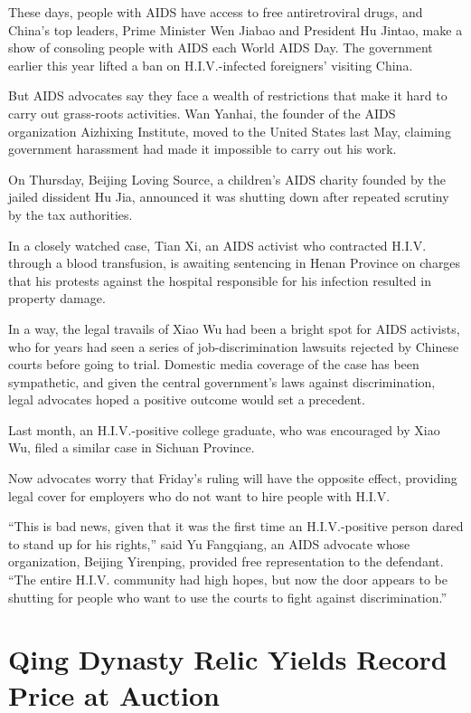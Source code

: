 ﻿\documentclass[12pt]{article}
\begin{document}
These days, people with AIDS have access to free antiretroviral drugs, and China's top leaders,
Prime Minister Wen Jiabao and President Hu Jintao, make a show of consoling people with AIDS each
World AIDS Day. The government earlier this year lifted a ban on H.I.V.-infected foreigners'
visiting China.

But AIDS advocates say they face a wealth of restrictions that make it hard to carry out grass-roots
activities. Wan Yanhai, the founder of the AIDS organization Aizhixing Institute, moved to the
United States last May, claiming government harassment had made it impossible to carry out his work.

On Thursday, Beijing Loving Source, a children's AIDS charity founded by the jailed dissident Hu
Jia, announced it was shutting down after repeated scrutiny by the tax authorities.

In a closely watched case, Tian Xi, an AIDS activist who contracted H.I.V. through a blood
transfusion, is awaiting sentencing in Henan Province on charges that his protests against the
hospital responsible for his infection resulted in property damage.

In a way, the legal travails of Xiao Wu had been a bright spot for AIDS activists, who for years had
seen a series of job-discrimination lawsuits rejected by Chinese courts before going to trial.
Domestic media coverage of the case has been sympathetic, and given the central government's laws
against discrimination, legal advocates hoped a positive outcome would set a precedent.

Last month, an H.I.V.-positive college graduate, who was encouraged by Xiao Wu, filed a similar case
in Sichuan Province.

Now advocates worry that Friday's ruling will have the opposite effect, providing legal cover for
employers who do not want to hire people with H.I.V.

``This is bad news, given that it was the first time an H.I.V.-positive person dared to stand up for
his rights,'' said Yu Fangqiang, an AIDS advocate whose organization, Beijing Yirenping, provided
free representation to the defendant. ``The entire H.I.V. community had high hopes, but now the door
appears to be shutting for people who want to use the courts to fight against discrimination.''

\section{Qing Dynasty Relic Yields Record Price at Auction}
\end{document}

